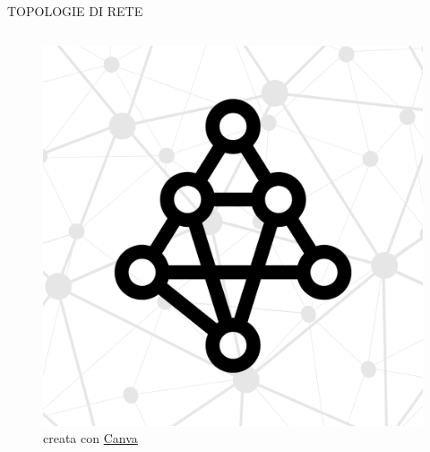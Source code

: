 \documentclass[aspectratio=1610]{beamer}
\begin{document}
\begin{frame}{TOPOLOGIE DI RETE}
\begin{columns}
\begin{figure}
                \includegraphics[width=\linewidth]{img/maglia.png}
                \caption{{creata con \href{https://www.canva.com/}{Canva}}}
            \end{figure}
    \end{columns}
\end{frame}
\end{document}

